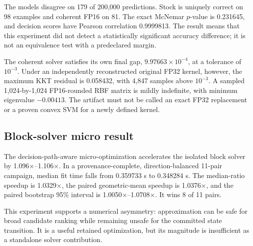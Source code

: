 The models disagree on 179 of 200,000 predictions. Stock is uniquely correct
on 98 examples and coherent FP16 on 81. The exact McNemar $p$-value is
0.231645, and decision scores have Pearson correlation 0.9999813. The result
means that this experiment did not detect a statistically significant
accuracy difference; it is not an equivalence test with a predeclared margin.

The coherent solver satisfies its own final gap,
$9.97663\times10^{-4}$, at a tolerance of $10^{-3}$. Under an independently
reconstructed original FP32 kernel, however, the maximum KKT residual is
0.058432, with 4,847 samples above $10^{-3}$. A sampled
1,024-by-1,024 FP16-rounded RBF matrix is mildly indefinite, with minimum
eigenvalue $-0.00413$. The artifact must not be called an exact FP32
replacement or a proven convex SVM for a newly defined kernel.

\subsection{Block-solver micro result}

The decision-path-aware micro-optimization accelerates the isolated block
solver by 1.096$\times$--1.106$\times$. In a provenance-complete,
direction-balanced 11-pair campaign, median fit time falls from 0.359733 s to
0.348284 s. The median-ratio speedup is 1.0329$\times$, the paired
geometric-mean speedup is 1.0376$\times$, and the paired bootstrap 95\%
interval is 1.0050$\times$--1.0708$\times$. It wins 8 of 11 pairs.

This experiment supports a numerical asymmetry: approximation can be safe for
broad candidate ranking while remaining unsafe for the committed state
transition. It is a useful retained optimization, but its magnitude is
insufficient as a standalone solver contribution.
